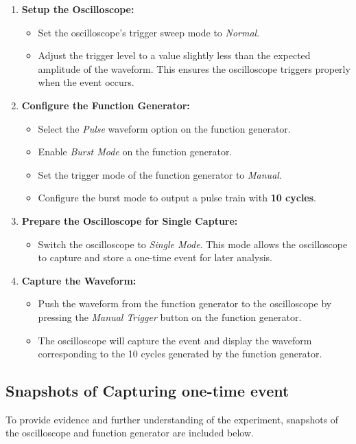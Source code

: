 \documentclass[12pt]{article}
\begin{document}
\begin{enumerate}
    \item \textbf{Setup the Oscilloscope:}
    \begin{itemize}
        \item Set the oscilloscope's trigger sweep mode to \textit{Normal}.
        \item Adjust the trigger level to a value slightly less than the expected amplitude of the waveform. This ensures the oscilloscope triggers properly when the event occurs.
    \end{itemize}
    
    \item \textbf{Configure the Function Generator:}
    \begin{itemize}
        \item Select the \textit{Pulse} waveform option on the function generator.
        \item Enable \textit{Burst Mode} on the function generator.
        \item Set the trigger mode of the function generator to \textit{Manual}.
        \item Configure the burst mode to output a pulse train with \textbf{10 cycles}.
    \end{itemize}
    
    \item \textbf{Prepare the Oscilloscope for Single Capture:}
    \begin{itemize}
        \item Switch the oscilloscope to \textit{Single Mode}. This mode allows the oscilloscope to capture and store a one-time event for later analysis.
    \end{itemize}
    
    \item \textbf{Capture the Waveform:}
    \begin{itemize}
        \item Push the waveform from the function generator to the oscilloscope by pressing the \textit{Manual Trigger} button on the function generator.
        \item The oscilloscope will capture the event and display the waveform corresponding to the 10 cycles generated by the function generator.
    \end{itemize}
\end{enumerate}
\subsection{Snapshots of Capturing one-time event}
To provide evidence and further understanding of the experiment, snapshots of the oscilloscope and function generator are included below.
\end{document}
